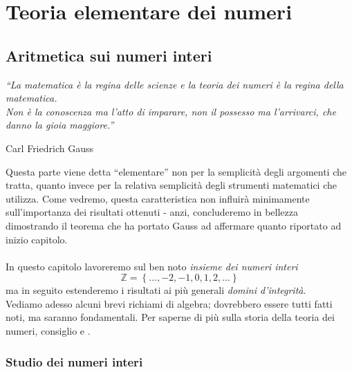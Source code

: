 \part{Teoria elementare dei numeri}





\chapter{Aritmetica sui numeri interi}
\label{lezione1}
\epigraph{\textit{\enquote{La matematica è la regina delle scienze e la teoria dei numeri è la regina della matematica. \\ Non è la conoscenza ma l'atto di imparare, non il possesso ma l'arrivarci, che danno la gioia maggiore.}}}{Carl Friedrich Gauss}
Questa parte viene detta \enquote{elementare} non per la semplicità degli argomenti che tratta, quanto invece per la relativa semplicità degli strumenti matematici che utilizza. Come vedremo, questa caratteristica non influirà minimamente sull'importanza dei risultati ottenuti - anzi, concluderemo in bellezza dimostrando il teorema che ha portato Gauss ad affermare quanto riportato ad inizio capitolo. \\ \\
In questo capitolo lavoreremo sul ben noto \textit{insieme dei numeri interi}
\begin{equation*}
	\mathbb{Z}= \left\{\dots,-2,-1,0,1,2,\dots\right\}
\end{equation*}
ma in seguito estenderemo i risultati ai più generali \textit{domini d'integrità}. \\ 
Vediamo adesso alcuni brevi richiami di algebra; dovrebbero essere tutti fatti noti, ma saranno fondamentali. Per saperne di più sulla storia della teoria dei numeri, consiglio \cite{D19} e \cite{G97}.


\section{Studio dei numeri interi}
